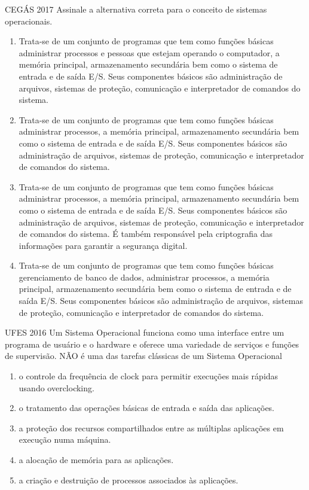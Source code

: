 \documentclass[aspectratio=169,
				xcolor=table]{beamer}
\begin{document}
	\begin{frame}{CEGÁS 2017 }
		Assinale a alternativa correta para o conceito de sistemas operacionais. 
		\begin{enumerate}[a]			
			\small
			\item Trata-se de um conjunto de programas que tem como funções básicas administrar processos e pessoas que estejam operando o computador, a memória principal, armazenamento secundária bem como o sistema de entrada e de saída E/S. Seus componentes básicos são administração de arquivos, sistemas de proteção, comunicação e interpretador de comandos do sistema. 
			\item \alert{Trata-se de um conjunto de programas que tem como funções básicas administrar processos, a memória principal, armazenamento secundária bem como o sistema de entrada e de saída E/S. Seus componentes básicos são administração de arquivos, sistemas de proteção, comunicação e interpretador de comandos do sistema.} 
			\item Trata-se de um conjunto de programas que tem como funções básicas administrar processos, a memória principal, armazenamento secundária bem como o sistema de entrada e de saída E/S. Seus componentes básicos são administração de arquivos, sistemas de proteção, comunicação e interpretador de comandos do sistema. É também responsável pela criptografia das informações para garantir a segurança digital. 
			\item Trata-se de um conjunto de programas que tem como funções básicas gerenciamento de banco de dados, administrar processos, a memória principal, armazenamento secundária bem como o sistema de entrada e de saída E/S. Seus componentes básicos são administração de arquivos, sistemas de proteção, comunicação e interpretador de comandos do sistema.
		\end{enumerate}
	\end{frame}


	\begin{frame}{UFES 2016}
		Um Sistema Operacional funciona como uma interface entre um programa de usuário e o hardware e oferece uma variedade de serviços e funções de supervisão. NÃO é uma das tarefas clássicas de um Sistema Operacional 
		\begin{enumerate}[a]
			\item o controle da frequência de clock para permitir execuções mais rápidas usando overclocking. 
			\item o tratamento das operações básicas de entrada e saída das aplicações. 
			\item a proteção dos recursos compartilhados entre as múltiplas aplicações em execução numa máquina. 
			\item a alocação de memória para as aplicações. 
			\item a criação e destruição de processos associados às aplicações.			
		\end{enumerate}
	\end{frame}
	
\end{document}

